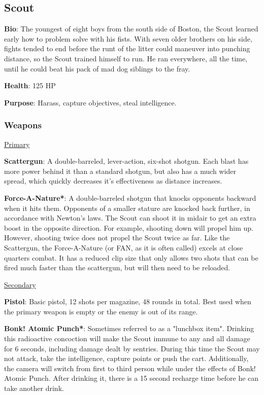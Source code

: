 \subsection{Scout}
\label{Scout}
{\bf Bio}:
The youngest of eight boys from the south side of Boston, the Scout learned early how to problem solve with his fists. With seven older brothers on his side, fights tended to end before the runt of the litter could maneuver into punching distance, so the Scout trained himself to run. He ran everywhere, all the time, until he could beat his pack of mad dog siblings to the fray.

{\bf Health}: 125 HP

{\bf Purpose}:
Harass, capture objectives, steal intelligence.

\subsubsection {Weapons}

\begin {center}
\underline {Primary}
\end {center}

{\bf Scattergun}:  A double-barreled, lever-action, six-shot shotgun. Each blast has more power behind it than a standard shotgun, but also has a much wider spread, which quickly decreases it's effectiveness as distance increases.

{\bf Force-A-Nature*}: A double-barreled shotgun that knocks opponents backward when it hits them.  Opponents of a smaller stature are knocked back further, in accordance with Newton's laws.  The Scout can shoot it in midair to get an extra boost in the opposite direction.  For example, shooting down will propel him up. However, shooting twice does not propel the Scout twice as far. Like the Scattergun, the Force-A-Nature (or FAN, as it is often called) excels at close quarters combat.  It has a reduced clip size that only allows two shots that can be fired much faster than the scattergun, but will then need to be reloaded.


\begin {center}
\underline {Secondary}
\end {center}

{\bf Pistol}: Basic pistol, 12 shots per magazine, 48 rounds in total. Best used when the primary weapon is empty or the enemy is out of its range.

{\bf Bonk! Atomic Punch*}: Sometimes referred to as a "lunchbox item". Drinking this radioactive concoction will make the Scout immune to any and all damage for 6 seconds, including damage dealt by sentries. During this time the Scout may not attack, take the intelligence, capture points or push the cart. Additionally, the camera will switch from first to third person while under the effects of Bonk! Atomic Punch. After drinking it, there is a 15 second recharge time before he can take another drink.

